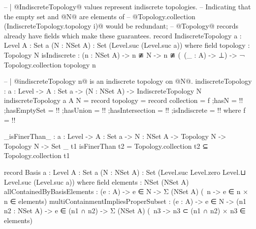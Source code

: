 \begin{code}
-- | @IndiscreteTopology@ values represent indiscrete topologies.
-- Indicating that the empty set and @N@ are elements of
-- @Topology.collection (IndiscreteTopology.topology i)@ would be redundant;
-- @Topology@ records already have fields which make these guarantees.
record IndiscreteTopology {a : Level}
                          {A : Set a}
                          (N : NSet A) : Set (Level.suc (Level.suc a)) where
  field
    topology : Topology N
    isIndiscrete : (n : NSet A) ->
                   n ≇ N ->
                   n ≇ (\ (_ : A) -> ⊥)
                   -> ¬ Topology.collection topology n

-- | @indiscreteTopology n@ is an indiscrete topology on @N@.
indiscreteTopology : {a : Level} ->
                     {A : Set a} ->
                     (N : NSet A) ->
                     IndiscreteTopology N
indiscreteTopology {a} {A} N = record
  {topology = record
     {collection = f
     ;hasN = {!!}
     ;hasEmptySet = {!!}
     ;hasUnion = {!!}
     ;hasIntersection = {!!}
     }
  ;isIndiscrete = {!!}}
  where
  f = {!!}
  
_isFinerThan_ : {a : Level} ->
                {A : Set a} ->
                {N : NSet A} ->
                Topology N ->
                Topology N ->
                Set _
t1 isFinerThan t2 = Topology.collection t2 ⊆ Topology.collection t1

record Basis {a : Level}
             {A : Set a}
             (N : NSet A) : Set (Level.suc Level.zero Level.⊔ Level.suc (Level.suc a)) where
  field
   elements : NSet (NSet A)
   allContainedByBasisElements :
     (e : A) ->
     e ∈ N ->
     Σ (NSet A) (\ n -> e ∈ n × n ∈ elements)
   multiContainmentImpliesProperSubset :
     (e : A) ->
     e ∈ N ->
     (n1 n2 : NSet A) ->
     e ∈ (n1 ∩ n2) ->
     Σ (NSet A) (\ n3 -> n3 ⊂ (n1 ∩ n2) × n3 ∈ elements)
\end{code}

